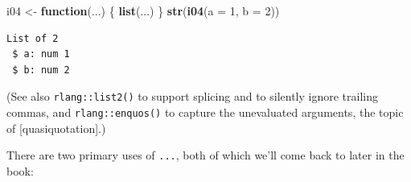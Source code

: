 \documentclass[]{book}
\newenvironment{Shaded}{\begin{snugshade}}{\end{snugshade}}
\newcommand{\ControlFlowTok}[1]{\textcolor[rgb]{0.13,0.29,0.53}{\textbf{#1}}}
\newcommand{\DataTypeTok}[1]{\textcolor[rgb]{0.13,0.29,0.53}{#1}}
\newcommand{\DecValTok}[1]{\textcolor[rgb]{0.00,0.00,0.81}{#1}}
\newcommand{\KeywordTok}[1]{\textcolor[rgb]{0.13,0.29,0.53}{\textbf{#1}}}
\newcommand{\NormalTok}[1]{#1}
\newcommand{\StringTok}[1]{\textcolor[rgb]{0.31,0.60,0.02}{#1}}
\theoremstyle{definition}
\theoremstyle{definition}
\theoremstyle{definition}
\theoremstyle{remark}
\begin{document}
\begin{Shaded}
\begin{Highlighting}[]
\NormalTok{i04 <-}\StringTok{ }\ControlFlowTok{function}\NormalTok{(...) \{}
  \KeywordTok{list}\NormalTok{(...)}
\NormalTok{\}}
\KeywordTok{str}\NormalTok{(}\KeywordTok{i04}\NormalTok{(}\DataTypeTok{a =} \DecValTok{1}\NormalTok{, }\DataTypeTok{b =} \DecValTok{2}\NormalTok{))}
\end{Highlighting}
\end{Shaded}

\begin{verbatim}
List of 2
 $ a: num 1
 $ b: num 2
\end{verbatim}

(See also \texttt{rlang::list2()} to support splicing and to silently
ignore trailing commas, and \texttt{rlang::enquos()} to capture the
unevaluated arguments, the topic of {[}quasiquotation{]}.)

There are two primary uses of \texttt{...}, both of which we'll come
back to later in the book:
\end{document}

